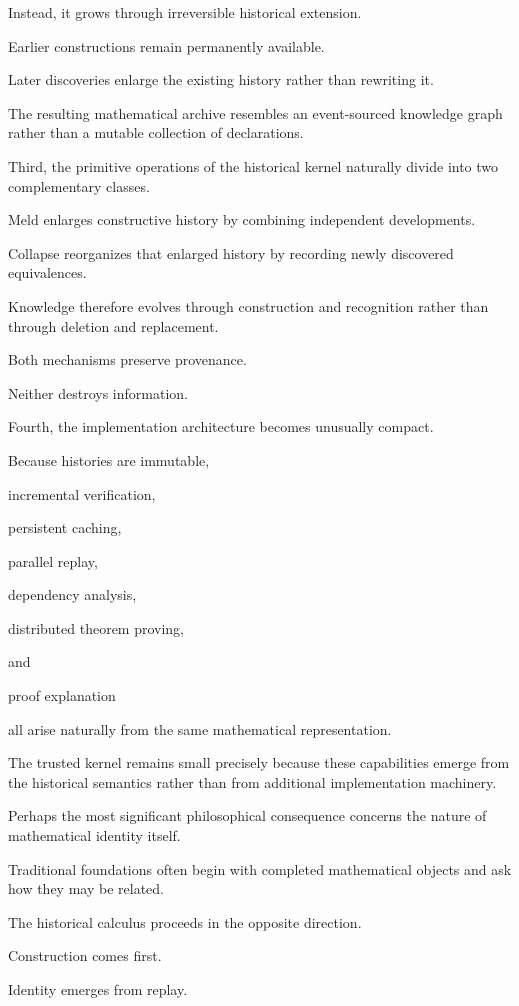 \documentclass[12pt,oneside]{article}
\theoremstyle{definition}
\theoremstyle{remark}
\begin{document}
Instead, it grows through irreversible historical extension.

Earlier constructions remain permanently available.

Later discoveries enlarge the existing history rather than rewriting it.

The resulting mathematical archive resembles an event-sourced knowledge graph
rather than a mutable collection of declarations.

Third, the primitive operations of the historical kernel naturally divide into
two complementary classes.

Meld enlarges constructive history by combining independent developments.

Collapse reorganizes that enlarged history by recording newly discovered
equivalences.

Knowledge therefore evolves through construction and recognition rather than
through deletion and replacement.

Both mechanisms preserve provenance.

Neither destroys information.

Fourth, the implementation architecture becomes unusually compact.

Because histories are immutable,

incremental verification,

persistent caching,

parallel replay,

dependency analysis,

distributed theorem proving,

and

proof explanation

all arise naturally from the same mathematical representation.

The trusted kernel remains small precisely because these capabilities emerge
from the historical semantics rather than from additional implementation
machinery.

Perhaps the most significant philosophical consequence concerns the nature of
mathematical identity itself.

Traditional foundations often begin with completed mathematical objects and ask
how they may be related.

The historical calculus proceeds in the opposite direction.

Construction comes first.

Identity emerges from replay.
\end{document}
